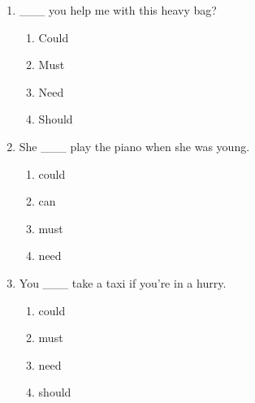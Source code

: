 \documentclass[11pt,a4paper]{ctexart}
\begin{document}
\begin{enumerate}[leftmargin=*,itemsep=4pt]
\begin{enumerate}[label=\Alph*.,leftmargin=2em,itemsep=1pt,topsep=2pt]
\end{enumerate}
\item \_\_\_ you help me with this heavy bag?
\begin{enumerate}[label=\Alph*.,leftmargin=2em,itemsep=1pt,topsep=2pt]
\item Could
\item Must
\item Need
\item Should
\end{enumerate}
\item She \_\_\_ play the piano when she was young.
\begin{enumerate}[label=\Alph*.,leftmargin=2em,itemsep=1pt,topsep=2pt]
\item could
\item can
\item must
\item need
\end{enumerate}
\item You \_\_\_ take a taxi if you’re in a hurry.
\begin{enumerate}[label=\Alph*.,leftmargin=2em,itemsep=1pt,topsep=2pt]
\item could
\item must
\item need
\item should
\end{enumerate}
\end{enumerate}
\end{document}
